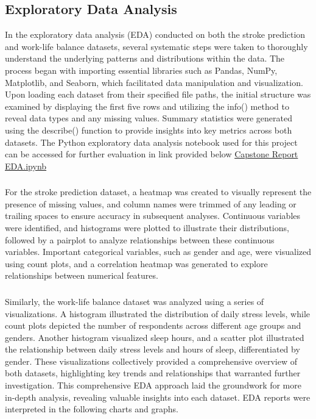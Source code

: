 \documentclass[runningheads]{llncs}
\begin{document}
\begin{enumerate}
\section{Exploratory Data Analysis}
In the exploratory data analysis (EDA) conducted on both the stroke prediction and work-life balance datasets, several systematic steps were taken to thoroughly understand the underlying patterns and distributions within the data. The process began with importing essential libraries such as Pandas, NumPy, Matplotlib, and Seaborn, which facilitated data manipulation and visualization. Upon loading each dataset from their specified file paths, the initial structure was examined by displaying the first five rows and utilizing the info() method to reveal data types and any missing values. Summary statistics were generated using the describe() function to provide insights into key metrics across both datasets. The Python exploratory data analysis notebook used for this project can be accessed for further evaluation in link provided below \href{https://github.com/alvaroquintero28/Capstone-Project-Report/blob/main/EDA.ipynb}{Capstone Report EDA.ipynb}

\subsubsection{}
For the stroke prediction dataset, a heatmap was created to visually represent the presence of missing values, and column names were trimmed of any leading or trailing spaces to ensure accuracy in subsequent analyses. Continuous variables were identified, and histograms were plotted to illustrate their distributions, followed by a pairplot to analyze relationships between these continuous variables. Important categorical variables, such as gender and age, were visualized using count plots, and a correlation heatmap was generated to explore relationships between numerical features. 

\subsubsection{}
Similarly, the work-life balance dataset was analyzed using a series of visualizations. A histogram illustrated the distribution of daily stress levels, while count plots depicted the number of respondents across different age groups and genders. Another histogram visualized sleep hours, and a scatter plot illustrated the relationship between daily stress levels and hours of sleep, differentiated by gender. These visualizations collectively provided a comprehensive overview of both datasets, highlighting key trends and relationships that warranted further investigation. This comprehensive EDA approach laid the groundwork for more in-depth analysis, revealing valuable insights into each dataset.
EDA reports were interpreted in the following charts and graphs.


\end{enumerate}
\end{document}
